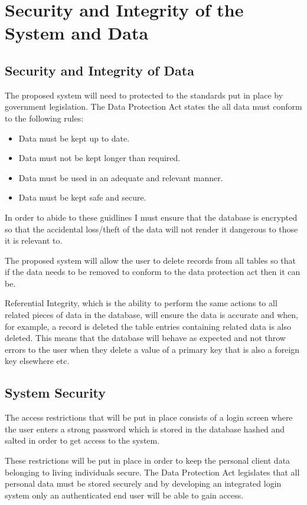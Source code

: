 \section{Security and Integrity of the System and Data}

\subsection{Security and Integrity of Data}

\begin{flushleft}

The proposed system will need to protected to the standards put in place by government legislation. The Data Protection Act states the all data must conform to the following rules:

\begin{itemize}
\item Data must be kept up to date.
\item Data must not be kept longer than required.
\item Data must be used in an adequate and relevant manner.
\item Data must be kept safe and secure.
\end{itemize}

In order to abide to these guidlines I must ensure that the database is encrypted so that the accidental loss/theft of the data will not render it dangerous to those it is relevant to.

The proposed system will allow the user to delete records from all tables so that if the data needs to be removed to conform to the data protection act then it can be.

Referential Integrity, which is the ability to perform the same actions to all related pieces of data in the database, will ensure the data is accurate and when, for example, a record is deleted the table entries containing related data is also deleted. This means that the database will behave as expected and not throw errors to the user when they delete a value of a primary key that is also a foreign key elsewhere etc.

\end{flushleft}
\subsection{System Security}

\begin{flushleft}
The access restrictions that will be put in place consists of a login screen where the user enters a strong password which is stored in the database hashed and salted in order to get access to the system.

These restrictions will be put in place in order to keep the personal client data belonging to living individuals secure. The Data Protection Act legislates that all personal data must be stored securely and by developing an integrated login system only an authenticated end user will be able to gain access.

\end{flushleft}

